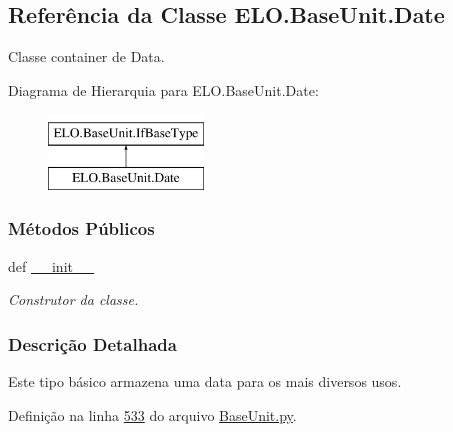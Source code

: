 \hypertarget{classELO_1_1BaseUnit_1_1Date}{\subsection{Referência da Classe E\-L\-O.\-Base\-Unit.\-Date}
\label{classELO_1_1BaseUnit_1_1Date}
}


Classe container de Data.  


Diagrama de Hierarquia para E\-L\-O.\-Base\-Unit.\-Date\-:\begin{figure}[H]
\begin{center}
\leavevmode
\includegraphics[height=2.000000cm]{d2/d74/classELO_1_1BaseUnit_1_1Date}
\end{center}
\end{figure}
\subsubsection*{Métodos Públicos}
\begin{DoxyCompactItemize}
\item 
def \hyperlink{classELO_1_1BaseUnit_1_1Date_a97d924fa5f1b2a1d8afbdbfe17b6a852}{\-\_\-\-\_\-init\-\_\-\-\_\-}
\begin{DoxyCompactList}\small\item\em Construtor da classe. \end{DoxyCompactList}\end{DoxyCompactItemize}


\subsubsection{Descrição Detalhada}
Este tipo básico armazena uma data para os mais diversos usos. 

Definição na linha \hyperlink{BaseUnit_8py_source_l00533}{533} do arquivo \hyperlink{BaseUnit_8py_source}{Base\-Unit.\-py}.



